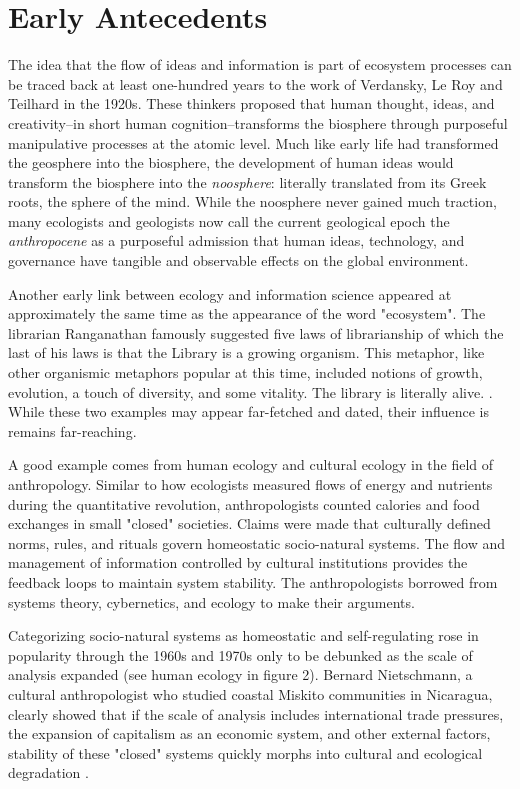 \section{Early Antecedents}

The idea that the flow of ideas and information is part of ecosystem processes can be traced back at least one-hundred years to the work of Verdansky, Le Roy and Teilhard in the 1920s. These thinkers proposed that human thought, ideas, and creativity--in short human cognition--transforms the biosphere through purposeful manipulative processes at the atomic level. Much like early life had transformed the geosphere into the biosphere, the development of human ideas would transform the biosphere into the \textit{noosphere}: literally translated from its Greek roots, the sphere of the mind. While the noosphere never gained much traction, many ecologists and geologists now call the current geological epoch the \textit{anthropocene} as a purposeful admission that human ideas, technology, and governance have tangible and observable effects on the global environment. 

Another early link between ecology and information science appeared at approximately the same time as the appearance of the word "ecosystem". The librarian Ranganathan famously suggested five laws of librarianship of which the last of his laws is that the Library is a growing organism. This metaphor, like other organismic metaphors popular at this time, included notions of growth, evolution, a touch of diversity, and some vitality. The library is literally alive. \citep{ranganathan_1931}. While these two examples may appear far-fetched and dated, their influence is remains far-reaching. 

A good example comes from human ecology and cultural ecology in the field of anthropology. Similar to how ecologists measured flows of energy and nutrients during the quantitative revolution, anthropologists counted calories and food exchanges in small "closed" societies. Claims were made that culturally defined norms, rules, and rituals govern homeostatic socio-natural systems. The flow and management of information controlled by cultural institutions provides the feedback loops to maintain system stability. The anthropologists borrowed from systems theory, cybernetics, and ecology to make their arguments. 

Categorizing socio-natural systems as homeostatic and self-regulating rose in popularity through the 1960s and 1970s only to be debunked as the scale of analysis expanded (see human ecology in figure 2). Bernard Nietschmann, a cultural anthropologist who studied coastal Miskito communities in Nicaragua, clearly showed that if the scale of analysis includes international trade pressures, the expansion of capitalism as an economic system, and other external factors, stability of these "closed" systems quickly morphs into cultural and ecological degradation \citep{nietschmannn_1973}.

